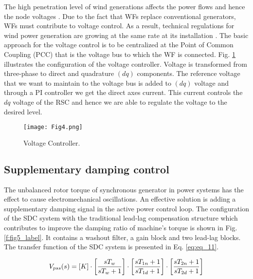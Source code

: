 \documentclass[conference,11pt]{IEEEtran}
\newcommand{\ignore}[2]{\hspace{0in}#2}
\begin{document}
The high penetration level of wind generations affects the power flows and hence the node voltages \cite{ref24}. Due to the fact that WFs replace conventional generators, WFs must contribute to voltage control. As a result, technical regulations for wind power generation are growing at the same rate at its installation \cite{ref25}. The basic approach for the voltage control is to be centralized at the Point of Common Coupling (PCC) that is the voltage bus to which the WF is connected. Fig. \ref{f:fig4_label} illustrates the configuration of the voltage controller. Voltage is transformed from three-phase to direct and quadrature $(dq)$ components. The reference voltage that we want to maintain to the voltage bus is added to $(dq)$ voltage and through a PI controller we get the direct axes current. This current controls the $dq$ voltage of the RSC and hence we are able to regulate the voltage to the desired level.

\begin{figure}[t]
  \centering
  \texttt{[image: Fig4.png]}
  \caption{Voltage Controller.}
  \label{f:fig4_label}
\end{figure} 



\subsection{Supplementary damping control}\label{ss:d_control}

The unbalanced rotor torque of synchronous generator in power systems has the effect to cause electromechanical oscillations. An effective solution is adding a supplementary damping signal in the active power control loop.  \ignore {In \cite{ref26}, damping controllers based on the Phillips-Heffron model are designed for damping low frequency oscillations. In this paper, the damping mechanism is presented and implemented to DFIG RSC control loop from the perspective of dynamic frequency.} The configuration of the SDC system with the traditional lead-lag compensation structure which contributes to improve the damping ratio of machine’s torque is shown in Fig. \ref{f:fig5_label}. It contains a washout filter, a gain block and two lead-lag blocks. The transfer function of the SDC system is presented in Eq. \ref{eq:eq_11}.

\begin{equation}
    \label{eq:eq_11}
   \small V_{pss} (s) = [K] \cdot \left[ \dfrac{sT_w}{sT_{w} + 1} \right]  \cdot \left[ \dfrac{sT_{1n} + 1}{sT_{1d} + 1} \right] \cdot \left[ \dfrac{sT_{2n} + 1}{sT_{2d} + 1} \right] 
\end{equation}
\end{document}
